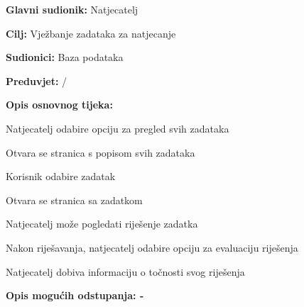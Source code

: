 				\begin{packed_item}
					
					\item \textbf{Glavni sudionik: } Natjecatelj
					\item  \textbf{Cilj:} Vježbanje zadataka za natjecanje
					\item  \textbf{Sudionici:} Baza podataka
					\item  \textbf{Preduvjet:}  / 
					\item  \textbf{Opis osnovnog tijeka:}
					
					\item[] \begin{packed_enum}
						\item Natjecatelj odabire opciju za pregled svih zadataka
						\item Otvara se stranica s popisom svih zadataka
						\item Korisnik odabire zadatak	
						\item Otvara se stranica sa zadatkom
						\item Natjecatelj može pogledati riješenje zadatka		
						\item Nakon riješavanja, natjecatelj odabire opciju za evaluaciju riješenja
						\item Natjecatelj dobiva informaciju o točnosti svog riješenja
					\end{packed_enum}
					
					\item  \textbf{Opis mogućih odstupanja: - } 
					
					
				\end{packed_item}
				
